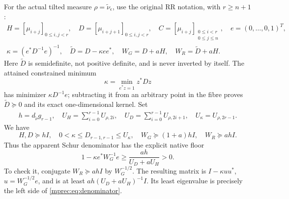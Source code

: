 For the actual tilted measure $\rho=\widetilde\nu_\epsilon$,
use the original RR notation, with $r\ge n+1$:
\begin{equation}\label{mprec:eq:RR}
 \begin{gathered}
 H=[\mu_{i+j}]_{0\le i,j<r},\quad
 D=[\mu_{i+j+1}]_{0\le i,j<r},\quad
 C=[\mu_{i+j}]_{\substack{0\le i<r\\0\le j\le n}},\quad
 e=(0,\ldots,0,1)^T,\\
 \kappa=(e^*D^{-1}e)^{-1},\quad \widetilde D=D-\kappa ee^*,
 \quad W_G=D+aH,\quad W_R=\widetilde D+aH.
 \end{gathered}
\end{equation}
Here $\widetilde D$ is semidefinite, not positive definite, and
is never inverted by itself. The attained constrained minimum
\begin{equation}\label{mprec:eq:kmin}
 \kappa=\min_{e^*z=1}z^*Dz
\end{equation}
has minimizer $\kappa D^{-1}e$; subtracting it from an arbitrary
point in the fibre proves $\widetilde D\succeq0$ and its exact
one-dimensional kernel. Set
\begin{equation}\label{mprec:eq:RRconstants}
 \begin{gathered}
 h=d_{\widetilde\nu}g_{r-1},\quad
 U_H=\sum_{i=0}^{r-1}U_{\rho,2i},\quad
 U_D=\sum_{i=0}^{r-1}U_{\rho,2i+1},\quad U_\kappa=U_{\rho,2r-1}.
 \end{gathered}
\end{equation}
We have
\begin{equation}\label{mprec:eq:radaufloor}
 H,D\succeq hI,\quad 0<\kappa\le D_{r-1,r-1}\le U_\kappa,
 \quad W_G\succeq(1+a)hI,\quad W_R\succeq ahI.
\end{equation}
Thus the apparent Schur denominator has the explicit native floor
\begin{equation}\label{mprec:eq:denominator}
 \boxed{1-\kappa e^*W_G^{-1}e\ge
                    \frac{ah}{U_D+aU_H}>0.}
\end{equation}
To check it, conjugate $W_R\succeq ahI$ by $W_G^{-1/2}$.
The resulting matrix is $I-\kappa uu^*$, $u=W_G^{-1/2}e$,
and is at least $ah(U_D+aU_H)^{-1}I$. Its least eigenvalue
is precisely the left side of \eqref{mprec:eq:denominator}.

